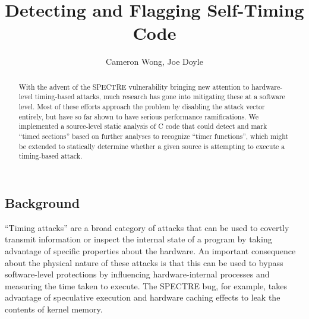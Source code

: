 \documentclass{article}
\title{Detecting and Flagging Self-Timing Code}
\author{Cameron Wong, Joe Doyle}
\begin{document}
\maketitle

\begin{abstract}
  With the advent of the SPECTRE vulnerability bringing new attention to
  hardware-level timing-based attacks, much research has gone into mitigating
  these at a software level. Most of these efforts approach the problem by
  disabling the attack vector entirely, but have so far shown to have serious
  performance ramifications. We implemented a source-level static analysis of
  C code that could detect and mark ``timed sections'' based on further
  analyses to recognize ``timer functions'', which might be extended to
  statically determine whether a given source is attempting to execute a
  timing-based attack.
\end{abstract}

\begin{multicols*}{2}
  \section{Background}

  ``Timing attacks'' are a broad category of attacks that can be used to
  covertly transmit information or inspect the internal state of a program by
  taking advantage of specific properties about the hardware. An important
  consequence about the physical nature of these attacks is that this can be
  used to bypass software-level protections by influencing hardware-internal
  processes and measuring the time taken to execute. The SPECTRE bug, for
  example, takes advantage of speculative execution and hardware caching
  effects to leak the contents of kernel memory.
\end{multicols*}
\end{document}
